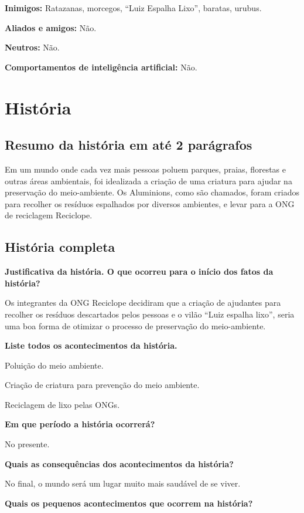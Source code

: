 \documentclass[]{scrartcl}
\begin{document}
\noindent\textbf{Inimigos:} Ratazanas, morcegos, “Luiz Espalha Lixo”, baratas, urubus.

\noindent\textbf{Aliados e amigos:} Não.

\noindent\textbf{Neutros:} Não.

\noindent\textbf{Comportamentos de inteligência artificial:} Não.

\section{História}

\subsection{Resumo da história em até 2 parágrafos}

Em um mundo onde cada vez mais pessoas poluem parques, praias, florestas e outras áreas ambientais, foi idealizada a criação de uma criatura para ajudar na preservação do meio-ambiente. Os Aluminions, como são chamados, foram criados para recolher os resíduos espalhados por diversos ambientes, e levar para a ONG de reciclagem Reciclope.

\subsection{História completa}

\noindent\textbf{Justificativa da história. O que ocorreu para o início dos fatos da história?}

Os integrantes da ONG Reciclope decidiram que a criação de ajudantes para recolher os resíduos descartados pelos pessoas e o vilão “Luiz espalha lixo”, seria uma boa forma de otimizar o processo de preservação do meio-ambiente.

\noindent\textbf{Liste todos os acontecimentos da história.}

Poluição do meio ambiente.

Criação de criatura para prevenção do meio ambiente.

Reciclagem de lixo pelas ONGs.

\noindent\textbf{Em que período a história ocorrerá?}

No presente.

\noindent\textbf{Quais as consequências dos acontecimentos da história?}

No final, o mundo será um lugar muito mais saudável de se viver.

\noindent\textbf{Quais os pequenos acontecimentos que ocorrem na história?}
\end{document}
